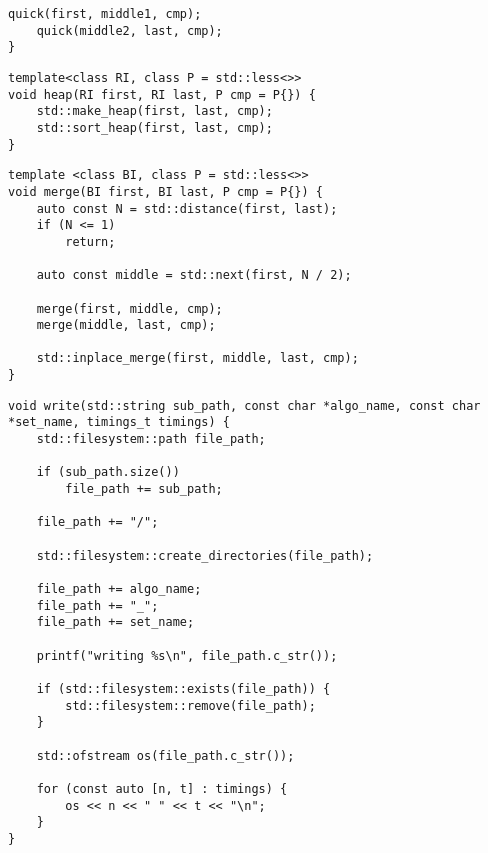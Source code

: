 \begin{appendices}
\begin{lstlisting}[float, label=lst:quick, caption={Implementation des \emph{quicksort}.}]
	quick(first, middle1, cmp);
	quick(middle2, last, cmp);
}
\end{lstlisting}

\begin{lstlisting}[float, label=lst:heap, caption={Implementation des \emph{heapsort}.}]
template<class RI, class P = std::less<>>
void heap(RI first, RI last, P cmp = P{}) {
    std::make_heap(first, last, cmp);
    std::sort_heap(first, last, cmp);
}
\end{lstlisting}

\begin{lstlisting}[float, label=lst:merge, caption={Implementation des \emph{merge sort}.}]
template <class BI, class P = std::less<>>
void merge(BI first, BI last, P cmp = P{}) {
	auto const N = std::distance(first, last);
	if (N <= 1)
		return;

	auto const middle = std::next(first, N / 2);

	merge(first, middle, cmp);
	merge(middle, last, cmp);

	std::inplace_merge(first, middle, last, cmp);
}
\end{lstlisting}

\begin{lstlisting}[float, label=lst:benchmark-write, caption={Implementation einer Funktion zum speichern von Benchmark-Ergebnissen.}]
void write(std::string sub_path, const char *algo_name, const char *set_name, timings_t timings) {
	std::filesystem::path file_path;

	if (sub_path.size())
		file_path += sub_path;

	file_path += "/";

	std::filesystem::create_directories(file_path);

	file_path += algo_name;
	file_path += "_";
	file_path += set_name;

	printf("writing %s\n", file_path.c_str());

	if (std::filesystem::exists(file_path)) {
		std::filesystem::remove(file_path);
	}

	std::ofstream os(file_path.c_str());

	for (const auto [n, t] : timings) {
		os << n << " " << t << "\n";
	}
}
\end{lstlisting}

\end{appendices}